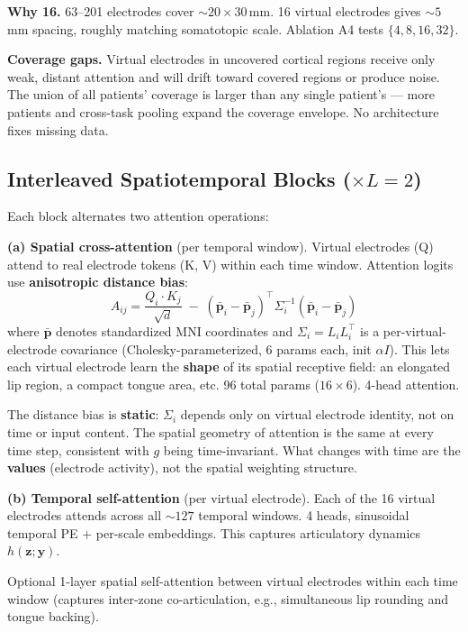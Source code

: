 \documentclass[11pt,letterpaper]{article}
\newcommand{\bfp}{\mathbf{p}}
\newcommand{\bfz}{\mathbf{z}}
\newcommand{\bfy}{\mathbf{y}}
\begin{document}
\textbf{Why 16.} 63--201 electrodes cover ${\sim}20 \times 30$\,mm. 16 virtual electrodes gives ${\sim}5$\,mm spacing, roughly matching somatotopic scale. Ablation A4 tests $\{4, 8, 16, 32\}$.

\textbf{Coverage gaps.} Virtual electrodes in uncovered cortical regions receive only weak, distant attention and will drift toward covered regions or produce noise. The union of all patients' coverage is larger than any single patient's --- more patients and cross-task pooling expand the coverage envelope. No architecture fixes missing data.


\subsection{Interleaved Spatiotemporal Blocks ($\times L{=}2$)}\label{sec:interleaved}

Each block alternates two attention operations:

\textbf{(a) Spatial cross-attention} (per temporal window). Virtual electrodes (Q) attend to real electrode tokens (K, V) within each time window. Attention logits use \textbf{anisotropic distance bias}:
\begin{equation}
A_{ij} = \frac{Q_i \cdot K_j}{\sqrt{d}} \;-\; (\bar{\bfp}_i - \bar{\bfp}_j)^\top \Sigma_i^{-1} (\bar{\bfp}_i - \bar{\bfp}_j)
\end{equation}
where $\bar{\bfp}$ denotes standardized MNI coordinates and $\Sigma_i = L_i L_i^\top$ is a per-virtual-electrode covariance (Cholesky-parameterized, 6 params each, init $\alpha I$). This lets each virtual electrode learn the \textbf{shape} of its spatial receptive field: an elongated lip region, a compact tongue area, etc. 96 total params ($16 \times 6$). 4-head attention.

The distance bias is \textbf{static}: $\Sigma_i$ depends only on virtual electrode identity, not on time or input content. The spatial geometry of attention is the same at every time step, consistent with $g$ being time-invariant. What changes with time are the \textbf{values} (electrode activity), not the spatial weighting structure.

\textbf{(b) Temporal self-attention} (per virtual electrode). Each of the 16 virtual electrodes attends across all ${\sim}127$ temporal windows. 4 heads, sinusoidal temporal PE + per-scale embeddings. This captures articulatory dynamics $h(\bfz; \bfy)$.

Optional 1-layer spatial self-attention between virtual electrodes within each time window (captures inter-zone co-articulation, e.g., simultaneous lip rounding and tongue backing).
\end{document}
